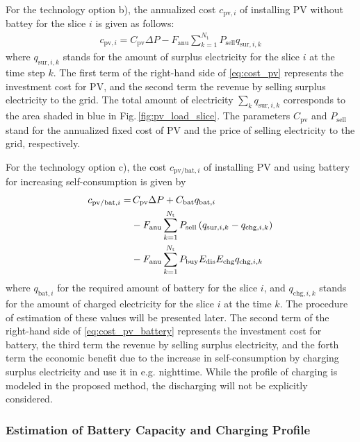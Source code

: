 \documentclass[lettersize,journal]{IEEEtran}
\newcommand{\figref}[1]{Fig.\,\ref{#1}}
\begin{document}
%
For the technology option b), the annualized cost $c_{\mathrm{pv},i}$ of installing PV without battey for the slice $i$ is given as follows: 
\begin{align} 
 c_{\mathrm{pv},i} = C_\mathrm{pv} \Delta P - F_\mathrm{anu}  \sum_{k=1}^{N_\mathrm{t}} P_\mathrm{sell} q_{\mathrm{sur},i,k} \label{eq:cost_pv}
\end{align}
where $q_{\mathrm{sur},i,k}$ stands for the amount of surplus electricity for the slice $i$ at the time step $k$. 
The first term of the right-hand side of \eqref{eq:cost_pv} represents the investment cost for PV, and the second term the revenue by selling surplus electricity to the grid. 
The total amount of electricity $\sum_k q_{\mathrm{sur},i,k}$ corresponds to the area shaded in blue in \figref{fig:pv_load_slice}. 
The parameters $C_\mathrm{pv}$ and $P_\mathrm{sell}$ stand for the annualized fixed cost of PV and the price of selling electricity to the grid, respectively. 


%
For the technology option c), the cost $c_{\mathrm{pv/bat},i}$ of installing PV and using battery for increasing self-consumption is given by 
\begin{align} \label{eq:cost_pv_battery}
 c_{\mathrm{pv/bat},i} = & \,
   C_\mathrm{pv}\Delta P  + C_\mathrm{bat} q_{\mathrm{bat},i}  \notag \\ 
   & - F_\mathrm{anu} \sum_{k=1}^{N_\mathrm{t}} P_{\mathrm{sell}} \left(  q_{\mathrm{sur},i,k} - q_{\mathrm{chg},i,k} \right)  \notag \\
  &  - F_\mathrm{anu} \sum_{k=1}^{N_\mathrm{t}} P_\mathrm{buy}  E_\mathrm{dis} E_\mathrm{chg}  q_{\mathrm{chg},i,k}   
\end{align}
where $q_{\mathrm{bat,}i}$ for the required amount of battery for the slice $i$, and $q_{\mathrm{chg},i,k}$ stands for the amount of charged electricity for the slice $i$ at the time $k$. 
The procedure of estimation of these values will be presented later. 
The second term of the right-hand side of \eqref{eq:cost_pv_battery} represents the investment cost for battery, the third term the revenue by selling surplus electricity, and the forth term  the economic benefit due to the increase in self-consumption by charging surplus electricity and use it in e.g. nighttime. 
While the profile of charging is modeled in the proposed method, the discharging will not be explicitly considered. 

\subsubsection{Estimation of Battery Capacity and Charging Profile}
\end{document}
